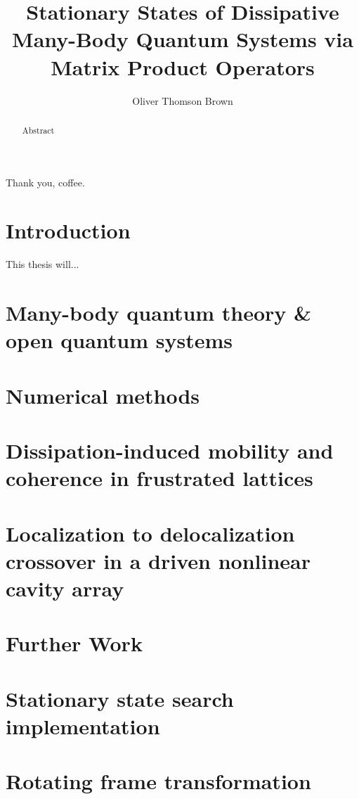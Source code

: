 \documentclass[a4paper,oneside,12pt]{hwthesis}
\author{Oliver Thomson Brown}
\title{Stationary States of Dissipative Many-Body Quantum Systems via Matrix Product Operators}
\newcommand*{\chappath}{../../include/chapters}
\newcommand*{\refpath}{../../include/refs}
\begin{document}
\maketitle


\begin{acknowledgements}
Thank you, coffee.
\end{acknowledgements}

\begin{abstract}
Abstract
\end{abstract}

\tableofcontents

\chapter{Introduction}
\setcounter{page}{1}

This thesis will...

\chapter[MBQT \& OQS]{\label{chp:MBQOQS}Many-body quantum theory \& open quantum systems}



\chapter{\label{chp:NM}Numerical methods}



\chapter[Frustrated lattices]{\label{chp:DIM}Dissipation-induced mobility and coherence in frustrated lattices}



\chapter[Driven nonlinear cavity array]{\label{chp:DNLCA}Localization to delocalization crossover in a driven nonlinear cavity array}



\chapter{Further Work}

\appendix
\chapter{\label{chp:mpostat}Stationary state search implementation}



\chapter{\label{chp:rotframe}Rotating frame transformation}





\end{document}
